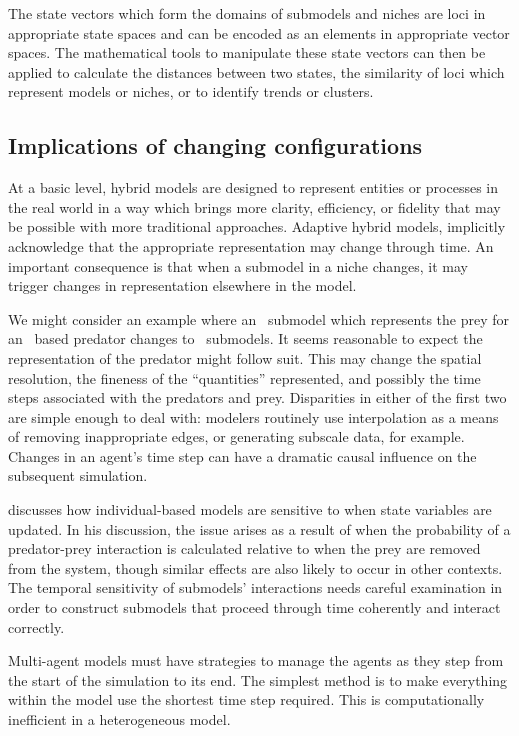 The state vectors which form the domains of sub\-models and niches are
loci in appropriate state spaces and can be encoded as an elements in
appropriate vector spaces. The math\-e\-mat\-i\-cal tools to manipulate these
state vectors can then be applied to calculate the distances between
two states, the similarity of loci which represent models or niches,
or to identify trends or clusters.



\subsection{Implications of changing con\-fig\-ur\-a\-tions}

At a basic level, hybrid models are designed to represent entities or
processes in the real world in a way which brings more clarity,
efficiency, or fidelity that may be possible with more traditional
approaches. Adaptive hybrid models, implicitly acknowledge that the
appropriate rep\-re\-sen\-ta\-tion may change through time. An important
consequence is that when a sub\-model in a niche changes, it may trigger
changes in rep\-re\-sen\-ta\-tion elsewhere in the model.

We might consider an example where an \SD\ sub\-model which represents
the prey for an \SD\ based predator changes to \IB\ sub\-models. It
seems reasonable to expect the rep\-re\-sen\-ta\-tion of the predator might
follow suit. This may change the spatial resolution, the fineness of
the ``quantities'' represented, and possibly the time steps associated
with the predators and prey. Disparities in either of the first two
are simple enough to deal with: modelers routinely use interpolation
as a means of removing inappropriate edges, or generating subscale
data, for example.  Changes in an agent's time step can have a
dramatic causal influence on the subsequent simulation.

\cite{chivers2009generalised} discusses how in\-di\-vidu\-al-based models
are sen\-si\-tive to when state variables are updated.  In his discussion,
the issue arises as a result of when the probability of a
predator-prey in\-ter\-ac\-tion is cal\-cu\-la\-ted relative to when the prey are
re\-moved from the system, though sim\-i\-lar effects are also likely to
oc\-cur in other con\-texts. The temporal sen\-si\-tiv\-i\-ty of sub\-models'
interactions needs careful examination in order to construct sub\-models
that proceed through time coherently and interact correctly.

Multi-agent models must have strategies to manage the agents as they
step from the start of the simulation to its end.  The simplest method
is to make everything within the model use the shortest time step
required.  This is computationally inefficient in a heterogeneous
model.

